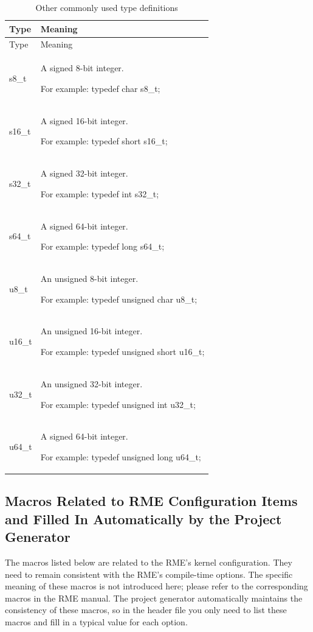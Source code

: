 \begin{xltabular}{\textwidth}{@{}>{\hsize\raggedright\arraybackslash}X>{\hsize\raggedright\arraybackslash}X@{}}
\caption{Other commonly used type definitions}\label{tab:8-2}\\
\toprule
Type & Meaning\tabularnewline
\endfirsthead
\toprule
Type & Meaning\tabularnewline
\midrule
\endhead
\bottomrule
\endlastfoot
s8\_\allowbreak{}t\strut
 & A signed 8-bit integer.

For example: typedef char s8\_t;\strut
\tabularnewline
s16\_\allowbreak{}t\strut
 & A signed 16-bit integer.

For example: typedef short s16\_t;\strut
\tabularnewline
s32\_\allowbreak{}t\strut
 & A signed 32-bit integer.

For example: typedef int s32\_t;\strut
\tabularnewline
s64\_\allowbreak{}t\strut
 & A signed 64-bit integer.

For example: typedef long s64\_t;\strut
\tabularnewline
u8\_\allowbreak{}t\strut
 & An unsigned 8-bit integer.

For example: typedef unsigned char u8\_t;\strut
\tabularnewline
u16\_\allowbreak{}t\strut
 & An unsigned 16-bit integer.

For example: typedef unsigned short u16\_t;\strut
\tabularnewline
u32\_\allowbreak{}t\strut
 & An unsigned 32-bit integer.

For example: typedef unsigned int u32\_t;\strut
\tabularnewline
u64\_\allowbreak{}t\strut
 & A signed 64-bit integer.

For example: typedef unsigned long u64\_t;\strut
\tabularnewline
\end{xltabular}

\subsection{Macros Related to RME Configuration Items and Filled In Automatically by the Project Generator}\label{subsec:8-2-2}

The macros listed below are related to the RME's kernel configuration. They need to remain consistent with the RME's compile-time options. The specific meaning of these macros is not introduced here; please refer to the corresponding macros in the RME manual. The project generator automatically maintains the consistency of these macros, so in the header file you only need to list these macros and fill in a typical value for each option.

